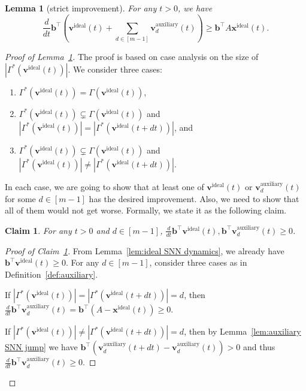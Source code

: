 \documentclass[11pt]{article}
\newtheorem{lemma}{Lemma}[section]
\newtheorem{claim}{Claim}[lemma]
\theoremstyle{remark}
\theoremstyle{definition}
\newcommand{\bx}{\mathbf{x}}
\newcommand{\bb}{\mathbf{b}}
\newcommand{\bv}{\mathbf{v}}
\begin{document}
\begin{lemma}[strict improvement]\label{lem:strict improvement}
	For any $t>0$, we have
	\begin{equation*}
	\frac{d}{dt}\bb^\top\left(\bv^\text{ideal}(t)+\sum_{d\in[m-1]}\bv^\text{auxiliary}_d(t)\right)\geq\bb^\top A\bx^\text{ideal}(t).
	\end{equation*}
\end{lemma}
\begin{proof}[Proof of Lemma~\ref{lem:strict improvement}]
	The proof is based on case analysis on the size of $|\Gamma^*(\bv^\text{ideal}(t))|$. We consider three cases:
	\begin{enumerate}[label=(\roman*)]
		\item $\Gamma^*(\bv^\text{ideal}(t))=\Gamma(\bv^\text{ideal}(t))$, 
		\item $\Gamma^*(\bv^\text{ideal}(t))\subsetneq\Gamma(\bv^\text{ideal}(t))$ and $|\Gamma^*(\bv^\text{ideal}(t))|=|\Gamma^*(\bv^\text{ideal}(t+dt))|$, and 
		\item $\Gamma^*(\bv^\text{ideal}(t))\subsetneq\Gamma(\bv^\text{ideal}(t))$ and $|\Gamma^*(\bv^\text{ideal}(t))|\neq|\Gamma^*(\bv^\text{ideal}(t+dt))|$.
	\end{enumerate}
	In each case, we are going to show that at least one of $\bv^\text{ideal}(t)$ or $\bv^\text{auxiliary}_d(t)$ for some $d\in[m-1]$ has the desired improvement. Also, we need to show that all of them would not get worse. Formally, we state it as the following claim.
	\begin{claim}\label{claim:ideal auxiliary does not get worse}
		For any $t>0$ and $d\in[m-1]$, $\frac{d}{dt}\bb^\top\bv^\text{ideal}(t),\bb^\top\bv^\text{auxiliary}_d(t)\geq0$.
	\end{claim}
	\begin{proof}[Proof of Claim~\ref{claim:ideal auxiliary does not get worse}]
		From Lemma~\ref{lem:ideal SNN dynamics}, we already have $\bb^\top\bv^\text{ideal}(t)\geq0$. For any $d\in[m-1]$, consider three cases as in Definition~\ref{def:auxiliary}.
		
		If $|\Gamma^*(\bv^\text{ideal}(t))|=|\Gamma^*(\bv^\text{ideal}(t+dt))|=d$, then $\frac{d}{dt}\bb^\top\bv^\text{auxiliary}_d(t)=\bb^\top(A-\bx^\text{ideal}(t))\geq0$.
		
		If $|\Gamma^*(\bv^\text{ideal}(t))|\neq|\Gamma^*(\bv^\text{ideal}(t+dt))|=d$, then by Lemma~\ref{lem:auxiliary SNN jump} we have $\bb^\top\left(\bv^\text{auxiliary}_d(t+dt)-\bv^\text{auxiliary}_d(t)\right)>0$ and thus  $\frac{d}{dt}\bb^\top\bv^\text{auxiliary}_d(t)\geq0$.
		

\end{proof}
\end{proof}
\end{document}
